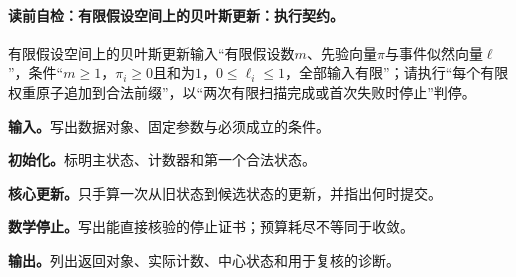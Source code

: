 \paragraph{读前自检：有限假设空间上的贝叶斯更新：执行契约。}有限假设空间上的贝叶斯更新输入“有限假设数$m$、先验向量$\pi$与事件似然向量$\ell$”，条件“$m\ge1$，$\pi_i\ge0$且和为$1$，$0\le\ell_i\le1$，全部输入有限”；请执行“每个有限权重原子追加到合法前缀”，以“两次有限扫描完成或首次失败时停止”判停。\par
\begin{keypointbox}[title={有限假设空间上的贝叶斯更新：五步阅读}]
\textbf{输入。}写出数据对象、固定参数与必须成立的条件。\par
\textbf{初始化。}标明主状态、计数器和第一个合法状态。\par
\textbf{核心更新。}只手算一次从旧状态到候选状态的更新，并指出何时提交。\par
\textbf{数学停止。}写出能直接核验的停止证书；预算耗尽不等同于收敛。\par
\textbf{输出。}列出返回对象、实际计数、中心状态和用于复核的诊断。
\end{keypointbox}

